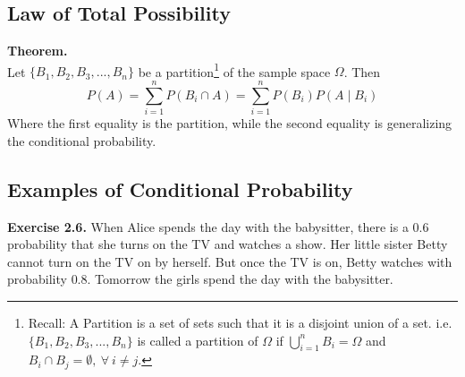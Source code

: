 \documentclass[12pt]{book}
\begin{document}
\subsection{Law of Total Possibility}
\textbf{Theorem. }\\
Let $\{B_1,B_2,B_3,...,B_n\}$ be a partition\footnote{Recall: A Partition is a set of sets such that it is a disjoint union of a set.
i.e. $\{B_1,B_2,B_3,...,B_n\}$ is called a partition of $\Omega$ if $\bigcup\limits_{i=1}^{n} B_{i}=\Omega$ and $B_{i}\cap B_{j}=\emptyset,~\forall~i\neq j.$} of the sample space $\Omega$. Then 
$$\boxed{P(A)=\sum\limits_{i=1}^{n} P(B_{i}\cap A)=\sum\limits_{i=1}^{n}P(B_{i})P(A\mid B_{i})}$$
Where the first equality is the partition, while the second equality is generalizing the conditional probability.




\subsection{Examples of Conditional Probability}
\textbf{Exercise 2.6. } When Alice spends the day with the babysitter, there is a $0.6$ probability that she turns on the TV and watches a show. Her little sister Betty cannot turn on the TV on by herself. But once the TV is on, Betty watches with probability $0.8$. Tomorrow the girls spend the day with the babysitter.\\

\end{document}
